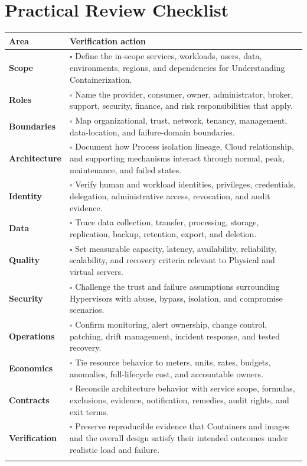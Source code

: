 \documentclass[11pt]{article}
\begin{document}
\section{Practical Review Checklist}
\begin{longtable}{@{}>{\bfseries\color{Teal}}p{}>{\RaggedRight\arraybackslash}p{}@{}}
\toprule\textbf{Area} & \textbf{Verification action}\\\midrule\endhead
Scope & $\square$ Define the in-scope services, workloads, users, data, environments, regions, and dependencies for Understanding Containerization. \\\addlinespace[2pt]
Roles & $\square$ Name the provider, consumer, owner, administrator, broker, support, security, finance, and risk responsibilities that apply. \\\addlinespace[2pt]
Boundaries & $\square$ Map organizational, trust, network, tenancy, management, data-location, and failure-domain boundaries. \\\addlinespace[2pt]
Architecture & $\square$ Document how Process isolation lineage, Cloud relationship, and supporting mechanisms interact through normal, peak, maintenance, and failed states. \\\addlinespace[2pt]
Identity & $\square$ Verify human and workload identities, privileges, credentials, delegation, administrative access, revocation, and audit evidence. \\\addlinespace[2pt]
Data & $\square$ Trace data collection, transfer, processing, storage, replication, backup, retention, export, and deletion. \\\addlinespace[2pt]
Quality & $\square$ Set measurable capacity, latency, availability, reliability, scalability, and recovery criteria relevant to Physical and virtual servers. \\\addlinespace[2pt]
Security & $\square$ Challenge the trust and failure assumptions surrounding Hypervisors with abuse, bypass, isolation, and compromise scenarios. \\\addlinespace[2pt]
Operations & $\square$ Confirm monitoring, alert ownership, change control, patching, drift management, incident response, and tested recovery. \\\addlinespace[2pt]
Economics & $\square$ Tie resource behavior to meters, units, rates, budgets, anomalies, full-lifecycle cost, and accountable owners. \\\addlinespace[2pt]
Contracts & $\square$ Reconcile architecture behavior with service scope, formulas, exclusions, evidence, notification, remedies, audit rights, and exit terms. \\\addlinespace[2pt]
Verification & $\square$ Preserve reproducible evidence that Containers and images and the overall design satisfy their intended outcomes under realistic load and failure. \\\addlinespace[2pt]
\bottomrule
\end{longtable}
\end{document}
